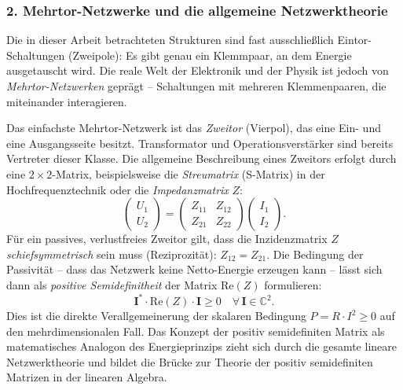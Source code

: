 ﻿\documentclass[12pt, a4paper]{article}
\begin{document}
	\subsubsection*{2. \quad Mehrtor-Netzwerke und die allgemeine Netzwerktheorie}

	Die in dieser Arbeit betrachteten Strukturen sind fast ausschließlich Eintor-Schaltungen (Zweipole): Es gibt genau ein Klemmpaar, an dem Energie ausgetauscht wird. Die reale Welt der Elektronik und der Physik ist jedoch von \textit{Mehrtor-Netzwerken} geprägt -- Schaltungen mit mehreren Klemmenpaaren, die miteinander interagieren.

	Das einfachste Mehrtor-Netzwerk ist das \textit{Zweitor} (Vierpol), das eine Ein- und eine Ausgangsseite besitzt. Transformator und Operationsverstärker sind bereits Vertreter dieser Klasse. Die allgemeine Beschreibung eines Zweitors erfolgt durch eine $2 \times 2$-Matrix, beispielsweise die \textit{Streumatrix} (S-Matrix) in der Hochfrequenztechnik oder die \textit{Impedanzmatrix} $Z$:
	\begin{equation}
		\begin{pmatrix} U_1 \\ U_2 \end{pmatrix} = \begin{pmatrix} Z_{11} & Z_{12} \\ Z_{21} & Z_{22} \end{pmatrix} \begin{pmatrix} I_1 \\ I_2 \end{pmatrix}.
	\end{equation}
	Für ein passives, verlustfreies Zweitor gilt, dass die Inzidenzmatrix $Z$ \textit{schiefsymmetrisch} sein muss (Reziprozität): $Z_{12} = Z_{21}$. Die Bedingung der Passivität -- dass das Netzwerk keine Netto-Energie erzeugen kann -- lässt sich dann als \textit{positive Semidefinitheit} der Matrix $\mathrm{Re}(Z)$ formulieren:
	\begin{equation}
		\mathbf{I}^* \cdot \mathrm{Re}(Z) \cdot \mathbf{I} \geq 0 \quad \forall\, \mathbf{I} \in \mathbb{C}^2.
	\end{equation}
	Dies ist die direkte Verallgemeinerung der skalaren Bedingung $P = R \cdot I^2 \geq 0$ auf den mehrdimensionalen Fall. Das Konzept der positiv semidefiniten Matrix als matematisches Analogon des Energieprinzips zieht sich durch die gesamte lineare Netzwerktheorie und bildet die Brücke zur Theorie der positiv semidefiniten Matrizen in der linearen Algebra.
\end{document}
